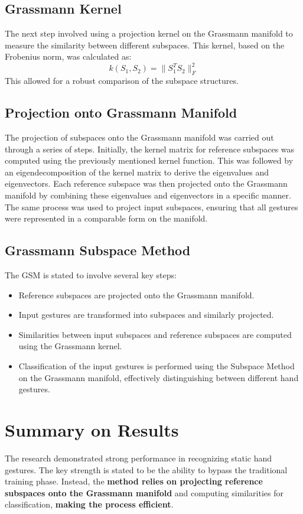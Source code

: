 \documentclass[12pt,a4paper]{article}
\begin{document}
\subsection{Grassmann Kernel}
The next step involved using a projection kernel on the Grassmann manifold to measure the similarity between different subspaces. This kernel, based on the Frobenius norm, was calculated as:
\[
k(S_1, S_2) = \|S_1^T S_2\|^2_F
\]
This allowed for a robust comparison of the subspace structures.

\subsection{Projection onto Grassmann Manifold}
The projection of subspaces onto the Grassmann manifold was carried out through a series of steps. Initially, the kernel matrix for reference subspaces was computed using the previously mentioned kernel function. This was followed by an eigendecomposition of the kernel matrix to derive the eigenvalues and eigenvectors. Each reference subspace was then projected onto the Grassmann manifold by combining these eigenvalues and eigenvectors in a specific manner. The same process was used to project input subspaces, ensuring that all gestures were represented in a comparable form on the manifold.

\subsection{Grassmann Subspace Method}
The GSM is stated to involve several key steps:
\begin{itemize}
    \item Reference subspaces are projected onto the Grassmann manifold.
    \item Input gestures are transformed into subspaces and similarly projected.
    \item Similarities between input subspaces and reference subspaces are computed using the Grassmann kernel.
    \item Classification of the input gestures is performed using the Subspace Method on the Grassmann manifold, effectively distinguishing between different hand gestures.
\end{itemize}

\section{Summary on Results}

The research demonstrated strong performance in recognizing static hand gestures. The key strength is stated to be the ability to bypass the traditional training phase. Instead, the \textbf{method relies on projecting reference subspaces onto the Grassmann manifold} and computing similarities for classification, \textbf{making the process efficient}.
\end{document}

